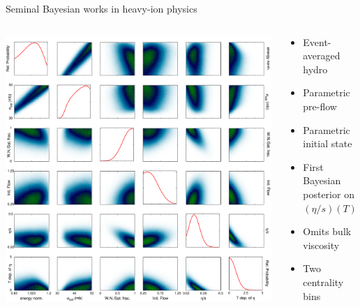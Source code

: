 \documentclass{beamer}
\begin{document}
\begin{frame}{Seminal Bayesian works in heavy-ion physics}
  \begin{columns}[T]
    \begin{column}{0.5\textwidth}
      \includegraphics[width=\textwidth]{pratt_fig11}
    \end{column}
    \begin{column}{0.5\textwidth}
      \begin{itemize}
        \item Event-averaged hydro
        \item Parametric pre-flow
        \item Parametric initial state
        \item First Bayesian posterior on $(\eta/s)(T)$
        \item Omits bulk viscosity
        \item Two centrality bins
      \end{itemize}
    \end{column}
  \end{columns}
  \vspace{1cm}
  \begin{columns}[T]
    \begin{column}{0.025\textwidth}
    \end{column}
    \begin{column}{0.05\textwidth}

\end{column}
\end{columns}
\end{frame}
\end{document}
